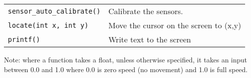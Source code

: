 \begin{longtable}[]{@{}ll@{}}
\begin{minipage}[t]{0.30\columnwidth}
\lstinline!sensor_auto_calibrate()!\strut
\end{minipage} & \begin{minipage}[t]{0.65\columnwidth}\raggedright\strut
Calibrate the sensors.\strut
\end{minipage}\tabularnewline
\begin{minipage}[t]{0.30\columnwidth}\raggedright\strut
\lstinline!locate(int x, int y)!\strut
\end{minipage} & \begin{minipage}[t]{0.65\columnwidth}\raggedright\strut
Move the cursor on the screen to (x,y)\strut
\end{minipage}\tabularnewline
\begin{minipage}[t]{0.30\columnwidth}\raggedright\strut
\lstinline!printf()!\strut
\end{minipage} & \begin{minipage}[t]{0.65\columnwidth}\raggedright\strut
Write text to the screen\strut
\end{minipage}\tabularnewline
\bottomrule
\end{longtable}

Note: where a function takes a float, unless otherwise specified, it
takes an input between 0.0 and 1.0 where 0.0 is zero speed (no movement)
and 1.0 is full speed.
